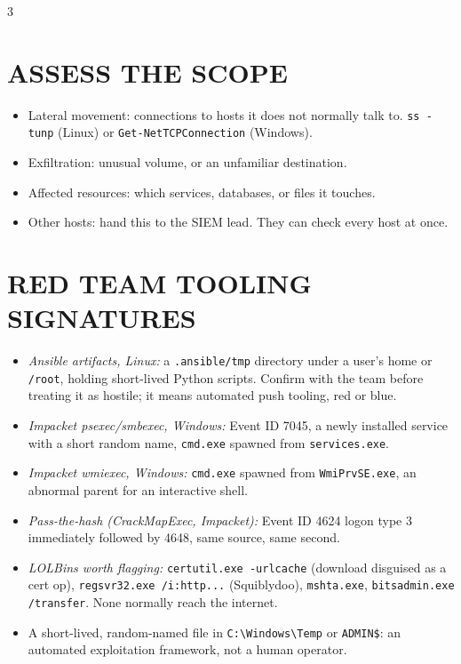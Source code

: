 \documentclass[7pt,landscape]{article}
\begin{document}
\begin{multicols*}{3}
\section{ASSESS THE SCOPE}
\begin{itemize}
    \item Lateral movement: connections to hosts it does not normally talk to. \texttt{ss -tunp} \textcolor{linuxc}{(Linux)} or \texttt{Get-NetTCPConnection} \textcolor{winc}{(Windows)}.
    \item Exfiltration: unusual volume, or an unfamiliar destination.
    \item Affected resources: which services, databases, or files it touches.
    \item Other hosts: hand this to the SIEM lead. They can check every host at once.
\end{itemize}

\section{RED TEAM TOOLING SIGNATURES}
\begin{itemize}
    \item \textit{Ansible artifacts, \textcolor{linuxc}{Linux:}} a \texttt{.ansible/tmp} directory under a user's home or \texttt{/root}, holding short-lived Python scripts. Confirm with the team before treating it as hostile; it means automated push tooling, red or blue.
    \item \textit{Impacket psexec/smbexec, \textcolor{winc}{Windows:}} Event ID 7045, a newly installed service with a short random name, \texttt{cmd.exe} spawned from \texttt{services.exe}.
    \item \textit{Impacket wmiexec, \textcolor{winc}{Windows:}} \texttt{cmd.exe} spawned from \texttt{WmiPrvSE.exe}, an abnormal parent for an interactive shell.
    \item \textit{Pass-the-hash (CrackMapExec, Impacket):} Event ID 4624 logon type 3 immediately followed by 4648, same source, same second.
    \item \textit{LOLBins worth flagging:} \texttt{certutil.exe -urlcache} (download disguised as a cert op), \texttt{regsvr32.exe /i:http...} (Squiblydoo), \texttt{mshta.exe}, \texttt{bitsadmin.exe /transfer}. None normally reach the internet.
    \item A short-lived, random-named file in \texttt{C:\textbackslash Windows\textbackslash Temp} or \texttt{ADMIN\$}: an automated exploitation framework, not a human operator.
\end{itemize}


\end{multicols*}
\end{document}
